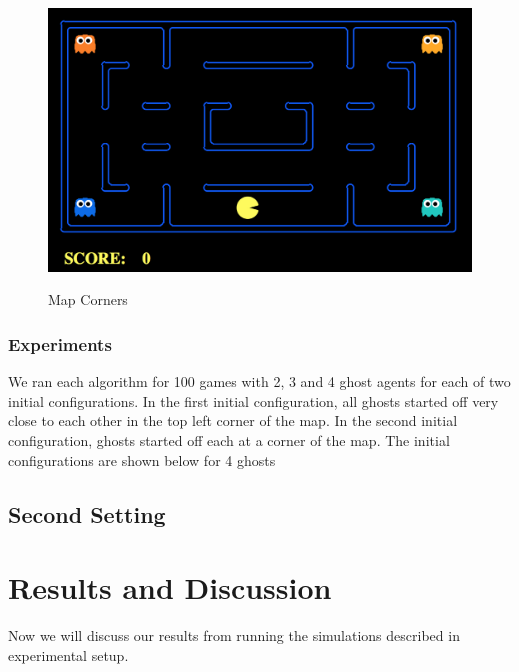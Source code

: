 \documentclass[11pt]{article}
\begin{document}
\begin{multicols}{2}
\begin{figure}
	\includegraphics[width=\columnwidth]{mapcorners.png}\\
	\caption{Map Corners}
	\label{fig:mapcorners}
\end{figure}

\subsubsection{Experiments}
We ran each algorithm for 100 games with 2, 3 and 4 ghost agents for each of two initial configurations. In the first initial configuration, all ghosts started off very close to each other in the top left corner of the map. In the second initial configuration, ghosts started off each at a corner of the map. The initial configurations are shown below for 4 ghosts

\subsection{Second Setting}

\section{Results and Discussion}

Now we will discuss our results from running the simulations described in experimental setup. 



\end{multicols}
\end{document}
